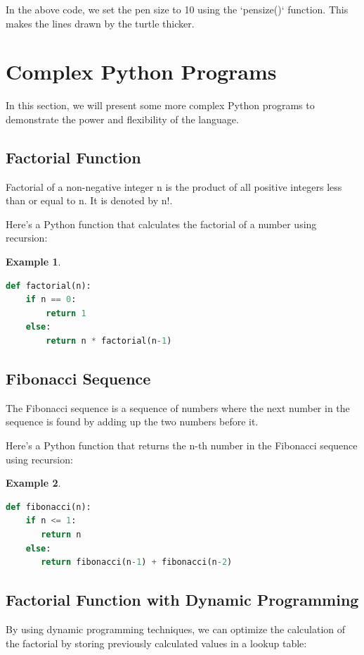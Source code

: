 \documentclass[12pt]{article}
\newtheorem{Example}{Example}[section]
\begin{document}
In the above code, we set the pen size to 10 using the `pensize()` function. This makes the lines drawn by the turtle thicker.

\newpage
\section{Complex Python Programs}
In this section, we will present some more complex Python programs to demonstrate the power and flexibility of the language.

\subsection{Factorial Function}
Factorial of a non-negative integer n is the product of all positive integers less than or equal to n. It is denoted by n!.


Here's a Python function that calculates the factorial of a number using recursion:
\begin{Example}
\begin{lstlisting}[language=Python]
def factorial(n):
    if n == 0:
        return 1
    else:
        return n * factorial(n-1)
\end{lstlisting}
\end{Example}

\subsection{Fibonacci Sequence}
The Fibonacci sequence is a sequence of numbers where the next number in the sequence is found by adding up the two numbers before it.


Here's a Python function that returns the n-th number in the Fibonacci sequence using recursion:
\begin{Example}
\begin{lstlisting}[language=Python]
def fibonacci(n):
    if n <= 1:
       return n
    else:
       return fibonacci(n-1) + fibonacci(n-2)
\end{lstlisting}
\end{Example}

\subsection{Factorial Function with Dynamic Programming}
By using dynamic programming techniques, we can optimize the calculation of the factorial by storing previously calculated values in a lookup table:
\end{document}
